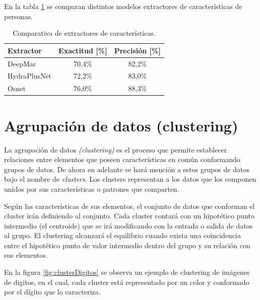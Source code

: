 
En la tabla \ref{tab:comparativaExtractores} se comparan distintos modelos extractores de características de personas.

\begin{table}[h]
	\centering
	\caption[Comparativa de extractores de características]{Comparativa de extractores de características.}
	\begin{tabular}{l c c}    
		\toprule
		\textbf{Extractor} & \textbf{Exactitud [\%]}  & \textbf{Precisión [\%]} \\
		\midrule
		DeepMar & 70,4\% & 82,2\% \\
		HydraPlusNet & 72,2\% & 83,0\% \\
		Osnet & 76,0\% & 88,3\% \\
		\bottomrule
		\hline
	\end{tabular}
	\label{tab:comparativaExtractores}
\end{table}

\newpage


\section{Agrupación de datos (clustering)}
\label{sec:clustering}

La agrupación de datos \textit{(clustering)} es el proceso que permite establecer relaciones entre elementos que poseen características en común conformando grupos de datos. De ahora en adelante se hará mención a estos grupos de datos bajo el nombre de \textit{clusters}. Los clusters representan a los datos que los componen  unidos por sus características o patrones que comparten.

Según las características de sus elementos, el conjunto de datos que conforman el cluster irán definiendo al conjunto. Cada cluster contará con un hipotético punto intermedio (el centroide) que se irá modificando con la entrada o salida de datos al grupo. El clustering alcanzará el equilibrio cuando exista una coincidencia entre el hipotético punto de valor intermedio dentro del grupo y su relación con sus elementos. 

En la figura \ref{fig:clusterDigitos} se observa un ejemplo de clustering de imágenes de digitos, en el cual, cada cluster está representado por un color y conformado por el dígito que lo caracteriza.

